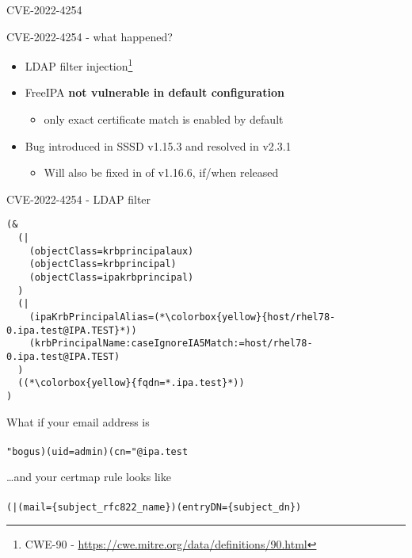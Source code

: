 \documentclass[ignorenonframetext,aspectratio=169,12pt]{beamer}
\begin{document}
\begin{frame}[plain]
\centering
\huge CVE-2022-4254
\end{frame}


\begin{frame}{CVE-2022-4254 - what happened?}
\protect\hypertarget{vuln-desc}{}

\begin{itemize}
\item LDAP filter injection\footnote{CWE-90 - \url{https://cwe.mitre.org/data/definitions/90.html}}
\item FreeIPA {\bf not vulnerable in default configuration}
    \begin{itemize}
        \item only exact certificate match is enabled by default
    \end{itemize}
\item Bug introduced in SSSD v1.15.3 and resolved in v2.3.1
    \begin{itemize}
        \item Will also be fixed in of v1.16.6, if/when released
    \end{itemize}
\end{itemize}
\end{frame}

\begin{frame}[fragile]{CVE-2022-4254 - LDAP filter}
\protect\hypertarget{vuln-filter-wildcard}{}
\begin{lstlisting}[basicstyle=\ttfamily\footnotesize]
(&
  (|
    (objectClass=krbprincipalaux)
    (objectClass=krbprincipal)
    (objectClass=ipakrbprincipal)
  )
  (|
    (ipaKrbPrincipalAlias=(*\colorbox{yellow}{host/rhel78-0.ipa.test@IPA.TEST}*))
    (krbPrincipalName:caseIgnoreIA5Match:=host/rhel78-0.ipa.test@IPA.TEST)
  )
  ((*\colorbox{yellow}{fqdn=*.ipa.test}*))
)
\end{lstlisting}
\end{frame}

\begin{frame}[plain]
\centering
\Large What if your email address is \\
    ~\\
    \large
    \texttt{"bogus)(uid=admin)(cn="@ipa.test}
\end{frame}

\begin{frame}[plain]
\centering
\Large \ldots{}and your certmap rule looks like \\
    ~\\
    \large
    \texttt{(|(mail=\{subject\_rfc822\_name\})(entryDN=\{subject\_dn\})}
\end{frame}
\end{document}
